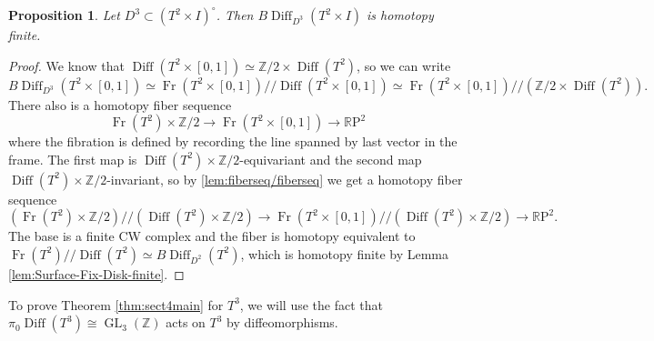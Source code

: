 \documentclass{amsart}
\theoremstyle{plain}
\newtheorem{prop}[thm]{Proposition}
\theoremstyle{definition}
\DeclareMathOperator\Diff{Diff}
\DeclareMathOperator\GL{GL}
\DeclareMathOperator\Fr{Fr}
\newcommand{\hq}{/\!\!/} %
\newcommand{\BDiff}{B\!\Diff}
\newcommand{\bbZ}{\mathbb{Z}}
\newcommand{\RP}{\mathbb{R}\mathrm{P}}
\newcommand{\Z}{\mathbb{Z}}
\begin{document}
\begin{prop}\label{prop: finiteness sphere or torus x I}
    Let $D^3\subset (T^2\times I)^\circ$. Then $\BDiff_{D^3}(T^2\times I)$ is homotopy finite.
\end{prop}
\begin{proof}
    We know that $\Diff(T^2 \times [0,1]) \simeq \bbZ/2 \times \Diff(T^2)$, so we can write
    \[
        \BDiff_{D^3}(T^2 \times [0,1]) \simeq \Fr(T^2 \times [0,1]) \hq \Diff(T^2 \times [0,1])
        \simeq \Fr(T^2 \times [0,1]) \hq (\bbZ/2 \times \Diff(T^2)).
    \]
    There also is a homotopy fiber sequence
    \[  
        \Fr(T^2) \times \bbZ/2 \longrightarrow
        \Fr(T^2 \times [0,1]) \longrightarrow
        \RP^2
    \]
    where the fibration is defined by recording the line spanned by last vector in the frame.
    The first map is $\Diff(T^2) \times \bbZ/2$-equivariant and the second map $\Diff(T^2) \times \bbZ/2$-invariant, so by \cref{lem:fiberseq/fiberseq} we get a homotopy fiber sequence
    \[  
        (\Fr(T^2) \times \bbZ/2)\hq (\Diff(T^2) \times \bbZ/2) \longrightarrow
        \Fr(T^2 \times [0,1])\hq (\Diff(T^2) \times \bbZ/2) \longrightarrow
        \RP^2.
    \]
    The base is a finite CW complex and the fiber is homotopy equivalent to $\Fr(T^2) \hq \Diff(T^2) \simeq \BDiff_{D^2}(T^2)$, which is homotopy finite by Lemma \ref{lem:Surface-Fix-Disk-finite}.
\end{proof}





To prove Theorem \ref{thm:sect4main} for $T^3$, we will use the fact that $\pi_0\Diff(T^3)\cong \GL_3(\Z)$ acts on $T^3$ by diffeomorphisms.
\end{document}
